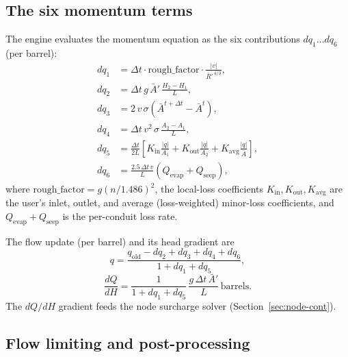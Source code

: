 \documentclass[11pt,a4paper]{article}
\begin{document}
\subsection{The six momentum terms}

The engine evaluates the momentum equation as the six contributions
$dq_1 \ldots dq_6$ (per barrel):
\begin{align}
  dq_1 &= \Delta t \cdot \mathrm{rough\_factor} \cdot
        \frac{\lvert v \rvert}{\bar R'^{\,4/3}}, \label{eq:dq1}\\
  dq_2 &= \Delta t\, g\, \bar A'\, \frac{H_2 - H_1}{L}, \label{eq:dq2}\\
  dq_3 &= 2\,v\,\sigma\left(\bar A^{t+\Delta t} - \bar A^{t}\right), \label{eq:dq3}\\
  dq_4 &= \Delta t\, v^{2}\, \sigma\,\frac{A_2 - A_1}{L}, \label{eq:dq4}\\
  dq_5 &= \frac{\Delta t}{2L}
          \left[ K_{\mathrm{in}}\frac{\lvert q \rvert}{A_1} +
                K_{\mathrm{out}}\frac{\lvert q \rvert}{A_2} +
                K_{\mathrm{avg}}\frac{\lvert q \rvert}{\bar A} \right], \label{eq:dq5}\\
  dq_6 &= \frac{2.5\,\Delta t\, v}{L}\left(Q_{\mathrm{evap}} +
          Q_{\mathrm{seep}}\right), \label{eq:dq6}
\end{align}
where $\mathrm{rough\_factor} = g(n/1.486)^2$, the local-loss coefficients
$K_{\mathrm{in}}, K_{\mathrm{out}}, K_{\mathrm{avg}}$ are the user's inlet,
outlet, and average (loss-weighted) minor-loss coefficients, and
$Q_{\mathrm{evap}} + Q_{\mathrm{seep}}$ is the per-conduit loss rate.

The flow update (per barrel) and its head gradient are
\begin{equation}
  q = \frac{q_{\mathrm{old}} - dq_2 + dq_3 + dq_4 + dq_6}
           {1 + dq_1 + dq_5},
  \label{eq:q-update}
\end{equation}
\begin{equation}
  \frac{dQ}{dH} = \frac{1}{1 + dq_1 + dq_5}\,
  \frac{g\,\Delta t\, \bar A'}{L}\,\mathrm{barrels}.
  \label{eq:dqdh}
\end{equation}
The $dQ/dH$ gradient feeds the node surcharge solver (Section~\ref{sec:node-cont}).

\subsection{Flow limiting and post-processing}
\end{document}
